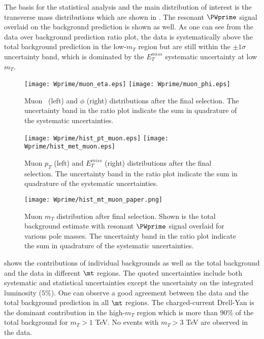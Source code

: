 The basis for the statistical analysis and the main distribution of interest 
is the transverse mass distributions which are shown in .
The resonant $\PWprime$ signal overlaid on the background prediction is shown as well.
As one can see from the data over background prediction ratio plot, the data is systematically above the total background prediction
in the low-$m_T$ region but are still within the $\pm 1 \sigma$ uncertainty band, which is dominated by the $E_T^{miss}$ systematic uncertainty at low $m_T$.

\begin{figure}[]
  \centering
  \texttt{[image: Wprime/muon\_eta.eps]}
  \texttt{[image: Wprime/muon\_phi.eps]}
  \caption{
  Muon \eta\ (left) and $\phi$ (right) distributions after the final selection. The uncertainty band in the ratio plot indicate the sum in quadrature of the systematic uncertainties.
}
  \label{fig:mu_results_etaphi}
\end{figure}

\begin{figure}[]
  \centering
  \texttt{[image: Wprime/hist\_pt\_muon.eps]}
  \texttt{[image: Wprime/hist\_met\_muon.eps]}
 \caption{
 Muon $p_T$ (left) and $E_T^{miss}$ (right) distributions after the final selection. The uncertainty band in the ratio plot indicate the sum in quadrature of the systematic uncertainties.
}
  \label{fig:mu_results_ptmet}
\end{figure}

\begin{figure}[]
  \centering
  \texttt{[image: Wprime/hist\_mt\_muon\_paper.png]}
  \caption{
  Muon $m_T$ distribution after final selection. 
  Shown is the total background estimate with resonant $\PWprime$ signal overlaid for various pole masses. 
  The uncertainty band in the ratio plot indicate the sum in quadrature of the systematic uncertainties.}
  \label{fig:MT_mu_Wprime}
\end{figure}

shows the contributions of individual backgrounds as well as the total background
and the data in different $\mt$ regions. The quoted uncertainties include both systematic and
statistical uncertainties except the uncertainty on the integrated luminosity ($5\%$).
One can observe a good agreement between the data and the total background prediction in all $\mt$ regions. The charged-current Drell-Yan is the dominant contribution in the high-$m_T$ region which is more than 90$\%$ of the total background for $m_T>1$ TeV. No events with $m_T > 3$ TeV are observed in the data.

